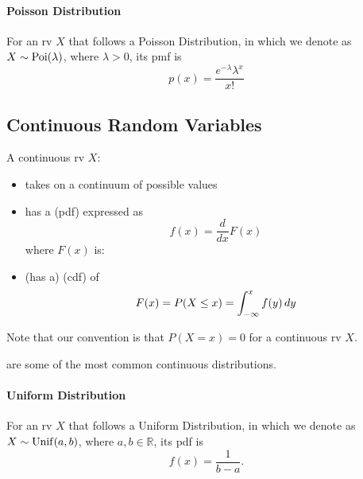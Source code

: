 \documentclass[notoc,notitlepage]{tufte-book}
\begin{document}
\paragraph{Poisson Distribution} For an rv $X$ that
follows a Poisson Distribution, in which we denote as $X \sim \operatorname{Poi}(\lambda)$,
where $\lambda > 0$, its pmf is
\begin{equation*}
  p(x) = \frac{e^{- \lambda} \lambda^{x}}{x!}
\end{equation*}


\subsection{Continuous Random Variables}%
\label{sub:continuous_random_variables}


A continuous rv $X$:
\begin{itemize}
  \item takes on a continuum of possible values
  \item has a  (pdf) expressed as
    \begin{equation*}
      f(x) = \frac{d}{dx} F(x)
    \end{equation*}
    where $F(x)$ is:
  \item (has a)  (cdf) of
    \begin{equation*}
      F(x) = P(X \leq x) = \int_{-\infty}^{x} f(y) \mathop{}\!d{y}
    \end{equation*}
\end{itemize}

\begin{note}
  Note that our convention is that $P(X = x) = 0$ for a continuous rv $X$.
\end{note}

 are some of the most common continuous
distributions.

\paragraph{Uniform Distribution} For an rv $X$ that
follows a Uniform Distribution, in which we denote as $X \sim \operatorname{Unif}(a, b)$,
where $a, b \in \mathbb{R}$, its pdf is
\begin{equation*}
  f(x) = \frac{1}{b - a}.
\end{equation*}
\end{document}
